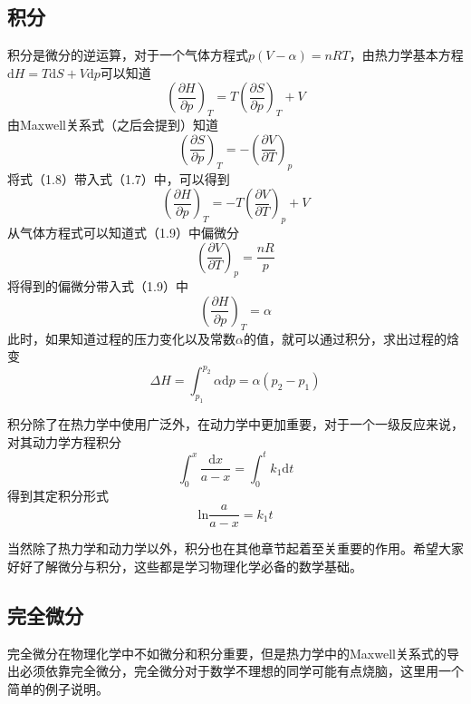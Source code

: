 \documentclass[lang=cn,newtx,11pt,scheme=chinese]{elegantbook}
\begin{document}
\subsection{积分}
积分是微分的逆运算，对于一个气体方程式$p(V-\alpha)=nRT$，由热力学基本方程$\mathrm{d}H=T\mathrm{d}S+V\mathrm{d}p$可以知道
\begin{equation}
	\left ( \frac{\partial H}{\partial p}  \right )_T=T\left ( \frac{\partial S}{\partial p}  \right )_T+V 
\end{equation}
由Maxwell关系式（之后会提到）知道
\begin{equation}
	\left ( \frac{\partial S}{\partial p}  \right )_T=-\left ( \frac{\partial V}{\partial T}  \right )_p 
\end{equation}
将式（1.8）带入式（1.7）中，可以得到
\begin{equation}
	\left ( \frac{\partial H}{\partial p}  \right )_T=-T \left ( \frac{\partial V}{\partial T}  \right )_p +V 
\end{equation}
从气体方程式可以知道式（1.9）中偏微分
\begin{equation}
	\left ( \frac{\partial V}{\partial T}  \right )_p=\frac{nR}{p} 
\end{equation}
将得到的偏微分带入式（1.9）中
\begin{equation}
	\left ( \frac{\partial H}{\partial p}  \right )_T=\alpha 
\end{equation}
此时，如果知道过程的压力变化以及常数$\alpha$的值，就可以通过积分，求出过程的焓变
\begin{equation}
	\Delta H=\int_{p_1}^{p_2} \alpha \mathrm{d}p=\alpha(p_2-p_1) 
\end{equation}

积分除了在热力学中使用广泛外，在动力学中更加重要，对于一个一级反应来说，对其动力学方程积分
\begin{equation}
	\int_{0}^{x} \frac{\mathrm{d}x }{a-x}=\int_{0}^{t}  k_1\mathrm{d}t 
\end{equation}
得到其定积分形式
\begin{equation}
	\mathrm{ln}\frac{a}{a-x}=k_1t  
\end{equation}

当然除了热力学和动力学以外，积分也在其他章节起着至关重要的作用。希望大家好好了解微分与积分，这些都是学习物理化学必备的数学基础。

\subsection{完全微分}
完全微分在物理化学中不如微分和积分重要，但是热力学中的Maxwell关系式的导出必须依靠完全微分，完全微分对于数学不理想的同学可能有点烧脑，这里用一个简单的例子说明。
\end{document}

